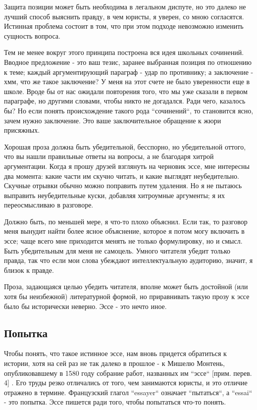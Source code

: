 \documentclass[ebook,12pt,oneside,openany]{memoir}
\begin{document}
Защита позиции может быть необходима в легальном диспуте, но это
далеко не лучший способ выяснить правду, в чем юристы, я уверен, со
мною согласятся. Истинная проблема состоит в том, что при этом подходе
невозможно изменить сущность вопроса. \newline

Тем не менее вокруг этого принципа построена вся идея школьных
сочинений. Вводное предложение - это ваш тезис, заранее выбранная
позиция по отношению к теме; каждый аргументирующий параграф - удар по
противнику; а заключение - хмм, что же такое заключение? У меня на
этот счете не было уверенности еще в школе. Вроде бы от нас ожидали
повторения того, что мы уже сказали в первом параграфе, но другими
словами, чтобы никто не догадался. Ради чего, казалось бы? Но если
понять происхождение такого рода ``сочинений``, то становится ясно,
зачем нужно заключение. Это ваше заключительное обращение к жюри
присяжных. \newline

Хорошая проза должна быть убедительной, бесспорно, но убедительной
оттого, что вы нашли правильные ответы на вопросы, а не благодаря
хитрой аргументации. Когда я прошу друзей взглянуть на черновик эссе,
мне интересны два момента: какие части им скучно читать, и какие
выглядят неубедительно. Скучные отрывки обычно можно поправить путем
удаления. Но я не пытаюсь выправить неубедительные куски, добавляя
хитроумные аргументы; я их переосмысливаю в разговоре. \newline

Должно быть, по меньшей мере, я что-то плохо объяснил. Если так, то
разговор меня вынудит найти более ясное объяснение, которое я потом
могу включить в эссе; чаще всего мне приходится менять не только
формулировку, но и смысл. Быть убедительным для меня не самоцель.
Умного читателя убедит только правда, так что если мои слова убеждают
интеллектуальную аудиторию, значит, я близок к правде. \newline

Проза, задающаяся целью убедить читателя, вполне может быть достойной
(или хотя бы неизбежной) литературной формой, но приравнивать такую
прозу к эссе было бы исторически неверно. Эссе - это нечто иное.

\subsection{Попытка}

Чтобы понять, что такое истинное эссе, нам вновь придется обратиться к
истории, хотя на сей раз не так далеко в прошлое - к Мишелю Монтень,
опубликовавшему в 1580 году собрание работ, названных им ``эссе``
[прим. перев. 4] . Его труды резко отличались от того, чем занимаются
юристы, и это отличие отражено в термине. Французский глагол
``essayer`` означает ``пытаться``, а ``essai`` - это попытка. Эссе
пишется ради того, чтобы попытаться что-то понять. \newline
\end{document}
